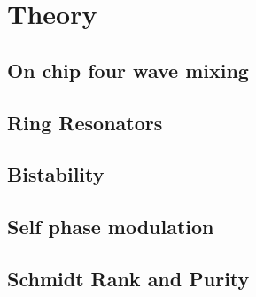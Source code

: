 \section{Theory}
\subsection{On chip four wave mixing}
\subsection{Ring Resonators}
\subsection{Bistability}
\subsection{Self phase modulation}
\subsection{Schmidt Rank and Purity}